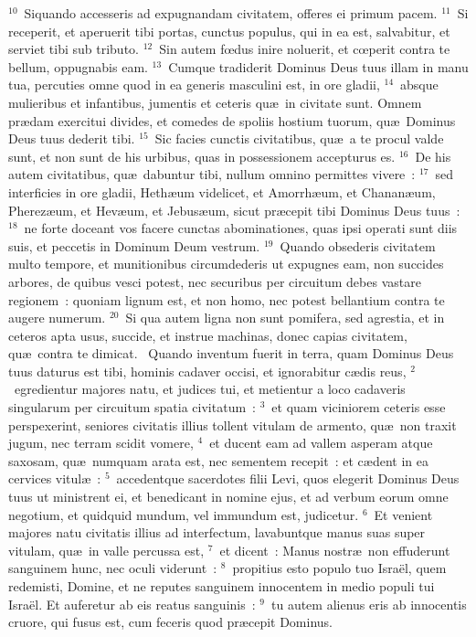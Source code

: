 ${}^{10}$~Siquando accesseris ad expugnandam civitatem, offeres ei primum pacem.
${}^{11}$~Si receperit, et aperuerit tibi portas, cunctus populus, qui in ea est, salvabitur, et serviet tibi sub tributo.
${}^{12}$~Sin autem fœdus inire noluerit, et cœperit contra te bellum, oppugnabis eam.
${}^{13}$~Cumque tradiderit Dominus Deus tuus illam in manu tua, percuties omne quod in ea generis masculini est, in ore gladii,
${}^{14}$~absque mulieribus et infantibus, jumentis et ceteris qu\ae\ in civitate sunt. Omnem pr\ae dam exercitui divides, et comedes de spoliis hostium tuorum, qu\ae\ Dominus Deus tuus dederit tibi.
${}^{15}$~Sic facies cunctis civitatibus, qu\ae\ a te procul valde sunt, et non sunt de his urbibus, quas in possessionem accepturus es.
${}^{16}$~De his autem civitatibus, qu\ae\ dabuntur tibi, nullum omnino permittes vivere~:
${}^{17}$~sed interficies in ore gladii, Heth\ae um videlicet, et Amorrh\ae um, et Chanan\ae um, Pherez\ae um, et Hev\ae um, et Jebus\ae um, sicut pr\ae cepit tibi Dominus Deus tuus~:
${}^{18}$~ne forte doceant vos facere cunctas abominationes, quas ipsi operati sunt diis suis, et peccetis in Dominum Deum vestrum.
${}^{19}$~Quando obsederis civitatem multo tempore, et munitionibus circumdederis ut expugnes eam, non succides arbores, de quibus vesci potest, nec securibus per circuitum debes vastare regionem~: quoniam lignum est, et non homo, nec potest bellantium contra te augere numerum.
${}^{20}$~Si qua autem ligna non sunt pomifera, sed agrestia, et in ceteros apta usus, succide, et instrue machinas, donec capias civitatem, qu\ae\ contra te dimicat.
~Quando inventum fuerit in terra, quam Dominus Deus tuus daturus est tibi, hominis cadaver occisi, et ignorabitur c\ae dis reus,
${}^{2}$~egredientur majores natu, et judices tui, et metientur a loco cadaveris singularum per circuitum spatia civitatum~:
${}^{3}$~et quam viciniorem ceteris esse perspexerint, seniores civitatis illius tollent vitulam de armento, qu\ae\ non traxit jugum, nec terram scidit vomere,
${}^{4}$~et ducent eam ad vallem asperam atque saxosam, qu\ae\ numquam arata est, nec sementem recepit~: et c\ae dent in ea cervices vitul\ae~:
${}^{5}$~accedentque sacerdotes filii Levi, quos elegerit Dominus Deus tuus ut ministrent ei, et benedicant in nomine ejus, et ad verbum eorum omne negotium, et quidquid mundum, vel immundum est, judicetur.
${}^{6}$~Et venient majores natu civitatis illius ad interfectum, lavabuntque manus suas super vitulam, qu\ae\ in valle percussa est,
${}^{7}$~et dicent~: Manus nostr\ae\ non effuderunt sanguinem hunc, nec oculi viderunt~:
${}^{8}$~propitius esto populo tuo Isra\"el, quem redemisti, Domine, et ne reputes sanguinem innocentem in medio populi tui Isra\"el. Et auferetur ab eis reatus sanguinis~:
${}^{9}$~tu autem alienus eris ab innocentis cruore, qui fusus est, cum feceris quod pr\ae cepit Dominus.


